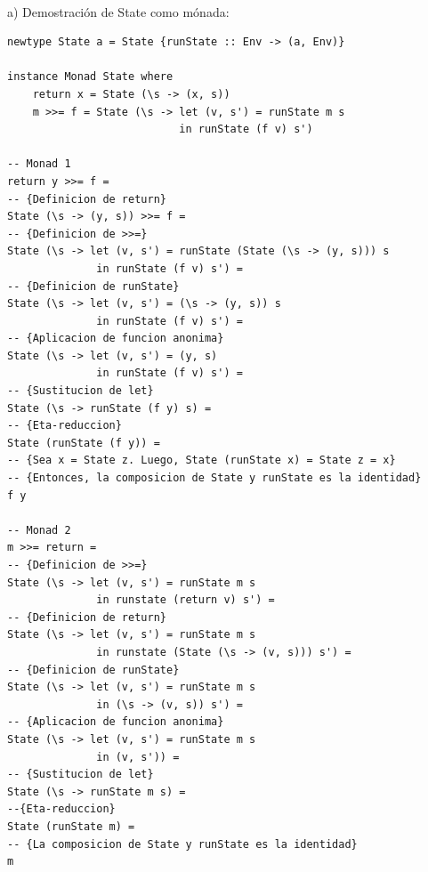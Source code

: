 \documentclass{article}
\begin{document}
\paragraph{} 
a) Demostración de State como mónada:
\begin{lstlisting}
newtype State a = State {runState :: Env -> (a, Env)}
 
instance Monad State where
    return x = State (\s -> (x, s))
    m >>= f = State (\s -> let (v, s') = runState m s
                           in runState (f v) s')
 
-- Monad 1
return y >>= f =
-- {Definicion de return}
State (\s -> (y, s)) >>= f =
-- {Definicion de >>=}
State (\s -> let (v, s') = runState (State (\s -> (y, s))) s
              in runState (f v) s') =                          
-- {Definicion de runState}
State (\s -> let (v, s') = (\s -> (y, s)) s
              in runState (f v) s') =                          
-- {Aplicacion de funcion anonima}
State (\s -> let (v, s') = (y, s)
              in runState (f v) s') =                          
-- {Sustitucion de let}
State (\s -> runState (f y) s) =                               
-- {Eta-reduccion}
State (runState (f y)) =                                       
-- {Sea x = State z. Luego, State (runState x) = State z = x}
-- {Entonces, la composicion de State y runState es la identidad}
f y

-- Monad 2
m >>= return =                                                 
-- {Definicion de >>=}
State (\s -> let (v, s') = runState m s 
              in runstate (return v) s') =                     
-- {Definicion de return}
State (\s -> let (v, s') = runState m s 
              in runstate (State (\s -> (v, s))) s') =         
-- {Definicion de runState}
State (\s -> let (v, s') = runState m s 
              in (\s -> (v, s)) s') =                          
-- {Aplicacion de funcion anonima}
State (\s -> let (v, s') = runState m s 
              in (v, s')) =                                    
-- {Sustitucion de let}
State (\s -> runState m s) =                                   
--{Eta-reduccion}
State (runState m) =                                           
-- {La composicion de State y runState es la identidad}
m


\end{lstlisting}
\end{document}
